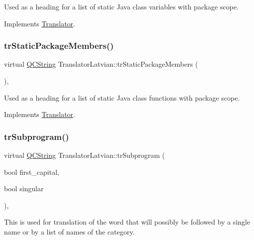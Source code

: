 Used as a heading for a list of static Java class variables with package scope. 

Implements \mbox{\hyperlink{class_translator}{Translator}}.

\mbox{\label{class_translator_latvian_aced680bdfb82018a2c54d828e524cb44}} 
\subsubsection{\texorpdfstring{trStaticPackageMembers()}{trStaticPackageMembers()}}
{\footnotesize\ttfamily virtual \mbox{\hyperlink{class_q_c_string}{Q\+C\+String}} Translator\+Latvian\+::tr\+Static\+Package\+Members (\begin{DoxyParamCaption}{ }\end{DoxyParamCaption})\hspace{0.3cm}{\ttfamily [inline]}, {\ttfamily [virtual]}}

Used as a heading for a list of static Java class functions with package scope. 

Implements \mbox{\hyperlink{class_translator}{Translator}}.

\mbox{\label{class_translator_latvian_aae04fa9189ce30f0152704f6bc9e4e75}} 
\subsubsection{\texorpdfstring{trSubprogram()}{trSubprogram()}}
{\footnotesize\ttfamily virtual \mbox{\hyperlink{class_q_c_string}{Q\+C\+String}} Translator\+Latvian\+::tr\+Subprogram (\begin{DoxyParamCaption}\item[{bool}]{first\+\_\+capital,  }\item[{bool}]{singular }\end{DoxyParamCaption})\hspace{0.3cm}{\ttfamily [inline]}, {\ttfamily [virtual]}}

This is used for translation of the word that will possibly be followed by a single name or by a list of names of the category. 

